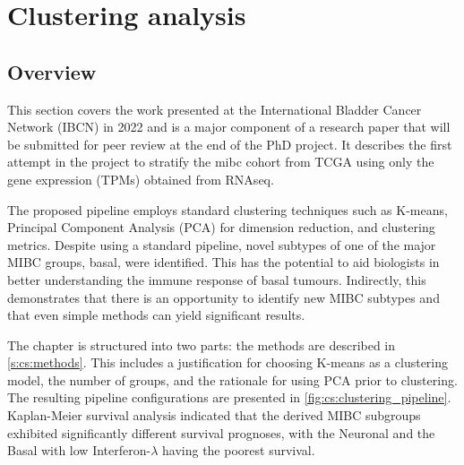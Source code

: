 \section{Clustering analysis} \label{s:clustering_analysis}

\vspace{3mm}
\vspace{3mm}

\subsection{Overview}

This section covers the work presented at the International Bladder Cancer Network (IBCN) in 2022 and is a major component of a research paper that will be submitted for peer review at the end of the PhD project. It describes the first attempt in the project to stratify the \acrfull{mibc} cohort from TCGA using only the gene expression (TPMs) obtained from RNAseq.

The proposed pipeline employs standard clustering techniques such as K-means, Principal Component Analysis (PCA) for dimension reduction, and clustering metrics. Despite using a standard pipeline, novel subtypes of one of the major MIBC groups, basal, were identified. This has the potential to aid biologists in better understanding the immune response of basal tumours. Indirectly, this demonstrates that there is an opportunity to identify new MIBC subtypes and that even simple methods can yield significant results.

The chapter is structured into two parts: the methods are described in \cref{s:cs:methods}. This includes a justification for choosing K-means as a clustering model, the number of groups, and the rationale for using PCA prior to clustering. The resulting pipeline configurations are presented in \cref{fig:cs:clustering_pipeline}. Kaplan-Meier survival analysis indicated that the derived MIBC subgroups exhibited significantly different survival prognoses, with the Neuronal and the Basal with low Interferon-$\lambda$ having the poorest survival.

